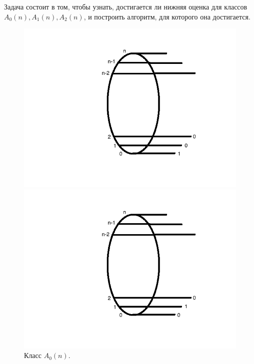 \documentclass[oneside, final, 14pt]{extreport}
\begin{document}
	\noindent Задача состоит в том, чтобы узнать, достигается ли нижняя оценка для классов $A_0(n), A_1(n), A_2(n)$, и построить алгоритм, для которого она 
	достигается.

 \begin{figure}[h]
 	\begin{center}
 		\begin{minipage}[h]{0.3\linewidth}
 			\includegraphics[width=1\linewidth]{A0}
 			\caption{Класс $A_0(n)$.} %
 			\label{ris:A0} %
 		\end{minipage}
 		\hfill 
 		\begin{minipage}[h]{0.3\linewidth}
 			\includegraphics[width=1\linewidth]{A1}

\end{minipage}
\end{center}
\end{figure}
\end{document}
